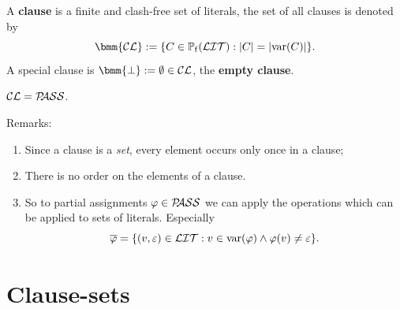 \documentclass[12pt]{book}
\begin{document}
\begin{defi}\label{def:cl}
      A \textbf{clause} is a finite and clash-free set of literals, the set of all clauses is denoted by
      $$\bmm{\Cl} := \set{C \in \pote(\Lit) : \abs{C} = \abs{\var(C)}}.$$
      A special clause is $\bmm{\bot} := \es \in \Cl$, the \textbf{empty clause}.
\end{defi}
\begin{lem}\label{lem::CLPASS}
      $\mathcal{CL} = \mathcal{P\hspace{-0.32em}ASS}$.
\end{lem}
Remarks:
\begin{enumerate}
      \item Since a clause is a \textit{set}, every element occurs only once in a clause;
      \item There is no order on the elements of a clause.
      \item So to partial assignments $\varphi \in \mathcal{P\hspace{-0.32em}ASS}$ we can apply the operations which can be applied to sets of literals. Especially
      $$\overline{\varphi} = \{ (v,\varepsilon) \in \mathcal{LIT} : v \in \operatorname{var}(\varphi) \wedge \varphi(v) \ne \varepsilon \}.$$
\end{enumerate}
\section{Clause-sets}
\label{sec:cls}
\end{document}
